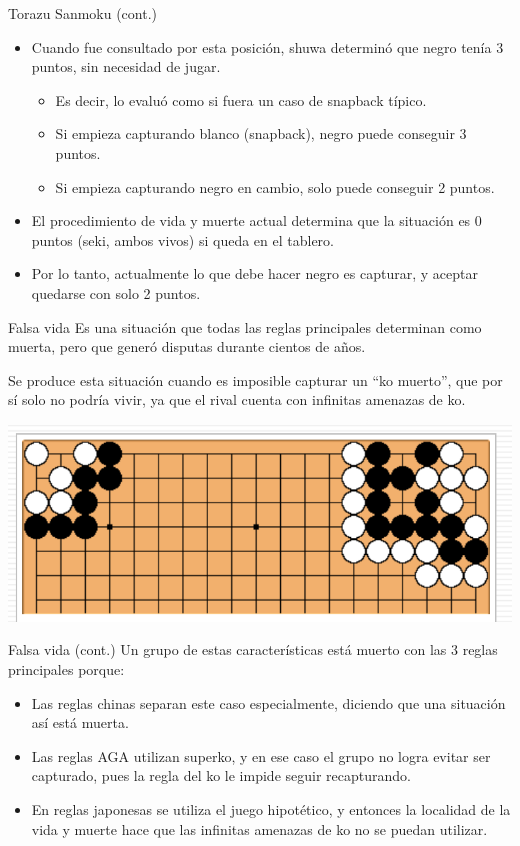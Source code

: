 \documentclass{beamer}
\begin{document}
\begin{frame}{Torazu Sanmoku (cont.)}
    \begin{itemize}
        \item Cuando fue consultado por esta posición, shuwa determinó que negro tenía 3 puntos, sin necesidad de jugar.
            \begin{itemize}
              \item Es decir, lo evaluó como si fuera un caso de snapback típico.
              \item Si empieza capturando blanco (snapback), negro puede conseguir 3 puntos.
              \item Si empieza capturando negro en cambio, solo puede conseguir 2 puntos.
            \end{itemize}
        \item El procedimiento de vida y muerte actual determina que la situación es 0 puntos (seki, ambos vivos) si queda en el tablero.
        \item Por lo tanto, actualmente lo que debe hacer negro es capturar, y aceptar quedarse con solo 2 puntos.
    \end{itemize}
\end{frame}


\begin{frame}{Falsa vida}
    Es una situación que todas las reglas principales determinan como muerta, pero que generó disputas durante cientos de años.
    
    Se produce esta situación cuando es imposible capturar un ``ko muerto'', que por sí solo no podría vivir, ya que el rival cuenta con infinitas amenazas de ko. 
    
    \includegraphics[scale=0.4]{falsa-vida.png}
\end{frame}

\begin{frame}{Falsa vida (cont.)}
    Un grupo de estas características está muerto con las 3 reglas principales porque:
    \begin{itemize}
        \item Las reglas chinas separan este caso especialmente, diciendo que una situación así está muerta.
        \item Las reglas AGA utilizan superko, y en ese caso el grupo no logra evitar ser capturado, pues la regla del ko le impide seguir recapturando.
        \item En reglas japonesas se utiliza el juego hipotético, y entonces la localidad de la vida y muerte hace que las infinitas amenazas de ko no se puedan utilizar.
    \end{itemize}
\end{frame}
\end{document}

